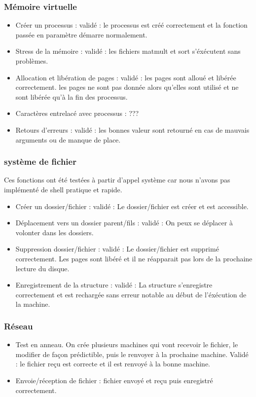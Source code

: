 \documentclass{article}
\begin{document}
		\subsubsection{Mémoire virtuelle}
			\begin{itemize}
				\item Créer un processus :					validé : le processus est créé correctement et la fonction passée en paramètre démarre normalement.
				\item Stress de la mémoire :				validé : les fichiers matmult et sort s'éxécutent sans problèmes.
				\item Allocation et libération de pages : 	validé : les pages sont alloué et libérée correctement. les pages ne sont pas donnée alors qu'elles sont utilisé et ne sont libérée qu'à la fin des processus.
				\item Caractères entrelacé avec processus : ???
				\item Retours d'erreurs : 					validé : les bonnes valeur sont retourné en cas de mauvais arguments ou de manque de place.
			\end{itemize}

		\subsubsection{système de fichier}
		Ces fonctions ont été testées à partir d'appel système car nous n'avons pas implémenté de shell pratique et rapide.
			\begin{itemize}
				\item Créer un dossier/fichier :				validé : Le dossier/fichier est créer et est accessible.
				\item Déplacement vers un dossier parent/fils :	validé : On peux se déplacer à volonter dans les dossiers.
				\item Suppression dossier/fichier :				validé : Le dossier/fichier est supprimé correctement. Les pages sont libéré et il ne réapparait pas lors de la prochaine lecture du disque.
				\item Enregistrement de la structure :			validé : La structure s'enregistre correctement et est rechargée sans erreur notable au début de l'éxécution de la machine.
			\end{itemize}

		\subsubsection{Réseau}
			\begin{itemize}
				\item Test en anneau. On crée plusieurs machines qui vont recevoir le fichier, le modifier de façon prédictible, puis le renvoyer à la prochaine machine. Validé : le fichier reçu est correcte et il est renvoyé à la bonne machine.
				\item Envoie/réception de fichier : fichier envoyé et reçu puis enregistré correctement.
			\end{itemize}
\end{document}
